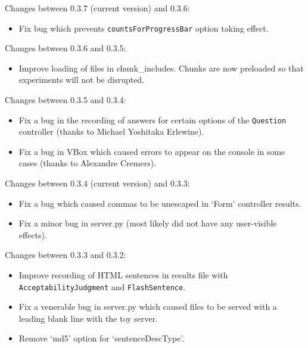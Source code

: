 \documentclass[]{article}
\begin{document}
Changes between 0.3.7 (current version) and 0.3.6:

\begin{itemize}
\itemsep1pt\parskip0pt
\item
  Fix bug which prevents \texttt{countsForProgressBar} option taking
  effect.
\end{itemize}

Changes between 0.3.6 and 0.3.5:

\begin{itemize}
\itemsep1pt\parskip0pt
\item
  Improve loading of files in chunk\_includes. Chunks are now preloaded
  so that experiments will not be disrupted.
\end{itemize}

Changes between 0.3.5 and 0.3.4:

\begin{itemize}
\itemsep1pt\parskip0pt
\item
  Fix a bug in the recording of answers for certain options of the
  \texttt{Question} controller (thanks to Michael Yoshitaka Erlewine).
\item
  Fix a bug in VBox which caused errors to appear on the console in some
  cases (thanks to Alexandre Cremers).
\end{itemize}

Changes between 0.3.4 (current version) and 0.3.3:

\begin{itemize}
\itemsep1pt\parskip0pt
\item
  Fix a bug which caused commas to be unescaped in `Form' controller
  results.
\item
  Fix a minor bug in server.py (most likely did not have any
  user-visible effects).
\end{itemize}

Changes between 0.3.3 and 0.3.2:

\begin{itemize}
\itemsep1pt\parskip0pt
\item
  Improve recording of HTML sentences in results file with
  \texttt{AcceptabilityJudgment} and \texttt{FlashSentence}.
\item
  Fix a venerable bug in server.py which caused files to be served with
  a leading blank line with the toy server.
\item
  Remove `md5' option for `sentenceDescType'.
\end{itemize}
\end{document}
